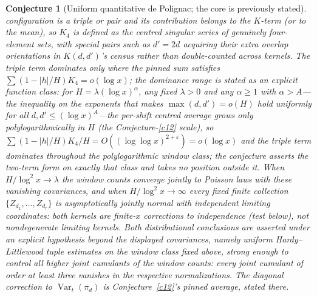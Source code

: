 \documentclass[11pt]{article}
\newtheorem{conjecture}{Conjecture}
\theoremstyle{definition}
\begin{document}
\begin{conjecture}[Uniform quantitative de Polignac; the core is
previously stated]
configuration is a triple or pair and its contribution belongs to
the $K$-term (or to the mean), so $K_4$ is defined as the centred
singular series of \emph{genuinely four-element} sets, with special
pairs such as $d'=2d$ acquiring their extra overlap orientations in
$K(d,d')$'s census rather than double-counted across kernels.  The
triple term dominates only
where the pinned sum satisfies $\sum(1-|h|/H)K_4=o(\log x)$; the
dominance range is stated as an explicit function class: for
$H=\lambda(\log x)^{\alpha}$, any
fixed $\lambda>0$ and any $\alpha\ge1$ with $\alpha>A$---the
inequality on the exponents that makes $\max(d,d')=o(H)$ hold
uniformly for all $d,d'\le(\log x)^{A}$---the per-shift centred average
grows only polylogarithmically in $H$ (the Conjecture-\ref{c12}
scale), so $\sum(1-|h|/H)K_4/H=O((\log\log x)^{2+\varepsilon})
=o(\log x)$ and the triple term dominates throughout the
polylogarithmic window class; the conjecture asserts the two-term
form on exactly that class and takes no position outside it.  When
$H/\log^2x\to\lambda$ the
window counts converge jointly to Poisson laws with these vanishing
covariances, and when $H/\log^2x\to\infty$ every fixed finite
collection $\{Z_{d_1},\dots,Z_{d_r}\}$ is asymptotically jointly
normal with \emph{independent} limiting coordinates: both kernels
are finite-$x$ corrections to independence (test below), not
nondegenerate limiting kernels.  Both distributional conclusions are
asserted under an explicit hypothesis beyond the displayed
covariances, namely uniform Hardy--Littlewood tuple estimates on the
window class fixed above, strong enough to control all higher joint
cumulants of the window counts: every joint cumulant of order at
least three vanishes in the respective normalizations.  The diagonal
correction to
$\operatorname{Var}_t(\pi_d)$ is Conjecture~\ref{c12}'s pinned
average, stated there.
\end{conjecture}
\end{document}
